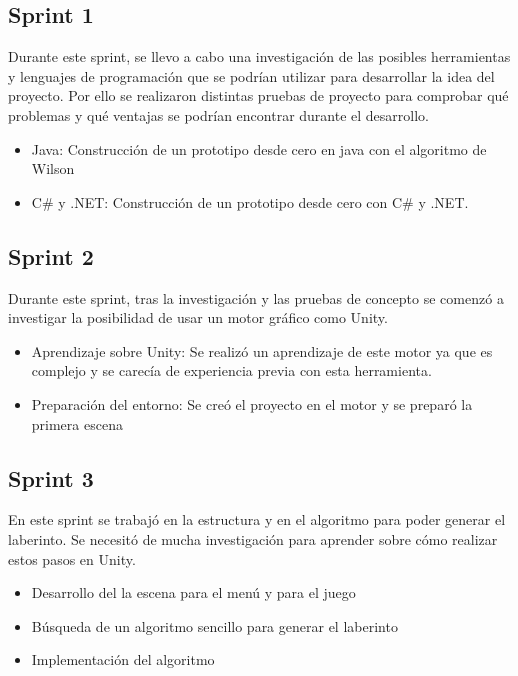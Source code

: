\subsection{Sprint 1}
Durante este sprint, se llevo a cabo una investigación de las posibles herramientas y lenguajes de programación que se podrían utilizar para desarrollar la idea del proyecto. Por ello se realizaron distintas pruebas de proyecto para comprobar qué problemas y qué ventajas se podrían encontrar durante el desarrollo. 
\begin{itemize}
    \item Java: Construcción de un prototipo desde cero en java con el algoritmo de Wilson
    \item C\# y .NET: Construcción de un prototipo desde cero con C\# y .NET.
\end{itemize}

\subsection{Sprint 2}
Durante este sprint, tras la investigación y las pruebas de concepto se comenzó a investigar la posibilidad de usar un motor gráfico como Unity. 
\begin{itemize}
    \item Aprendizaje sobre Unity: Se realizó un aprendizaje de este motor ya que es complejo y se carecía de experiencia previa con esta herramienta.
    \item Preparación del entorno: Se creó el proyecto en el motor y se preparó la primera escena
\end{itemize}

\subsection{Sprint 3}
En este sprint se trabajó en la estructura y en el algoritmo para poder generar el laberinto. Se necesitó de mucha investigación para aprender sobre cómo realizar estos pasos en Unity.
\begin{itemize}
    \item Desarrollo del la escena para el menú y para el juego
    \item Búsqueda de un algoritmo sencillo para generar el laberinto
    \item Implementación del algoritmo
\end{itemize}

